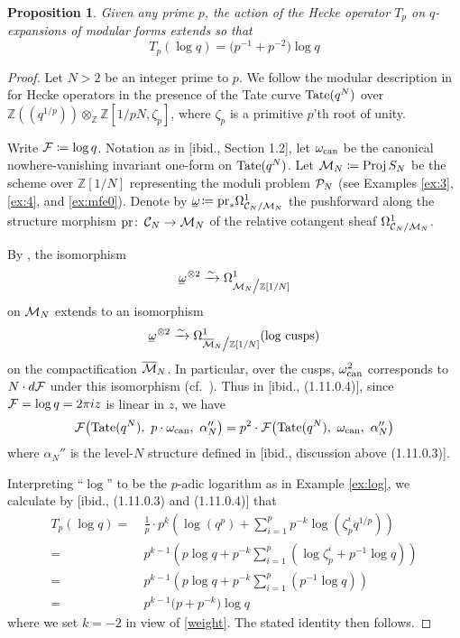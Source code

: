 \documentclass{gtpart}
\newtheorem{prop}[thm]{Proposition}
\theoremstyle{definition}
\theoremstyle{remark}
\def\co{\colon\thinspace}
\newcommand{\mb}[1]{\mathbb{#1}}
\newcommand{\Proj}{{\rm Proj\thinspace}}
\newcommand{\CC}{{\cal C}}
\newcommand{\CF}{{\cal F}}
\newcommand{\CM}{{\cal M}}
\newcommand{\CMB}{\overline {\cal M}}
\newcommand{\CP}{{\cal P}}
\newcommand{\BZ}{{\mb Z}}
\newcommand{\can}{{\rm can}}
\newcommand{\A}{\alpha}
\renewcommand{\o}{\omega}
\newcommand{\ou}{\underline{\omega\!}}
\newcommand{\ce}{\coloneqq}
\newcommand{\lp}{(\!(}
\newcommand{\rp}{)\!)}
\renewcommand{\=}{\approx}
\renewcommand{\-}{\sim}
\newcommand{\Tate}{{\rm Tate}}
\numberwithin{equation}{section}
\numberwithin{thm}{section}
\begin{document}
\begin{prop}
 \label{prop:logq}
 Given any prime $p$, the action of the Hecke operator $T_p$ on $q$-expansions of modular forms extends so that 
 \[
  T_p (\log q) = \big( p^{-1} + p^{-2} \big) \log q 
 \]
\end{prop}
\begin{proof}
 Let $N > 2$ be an integer prime to $p$.  
 We follow the modular description in \cite[Section 1.11]{padicprop} for Hecke operators in the presence of the Tate curve 
 $\Tate(q^N)$ over $\BZ \lp q^{1 / p} \rp \otimes_\BZ \BZ [1 / p N, \zeta_p]$, where $\zeta_p$ is a primitive $p$'th root of unity.  

 Write $\CF \ce \log q$.  
 Notation as in [ibid., Section 1.2], let $\o_\can$ be the canonical nowhere-vanishing invariant one-form on $\Tate(q^N)$.  
 Let $\CM_N \ce \Proj S_N$ be the scheme over $\BZ[1/N]$ representing the moduli problem $\CP_N$ (see Examples \ref{ex:3}, \ref{ex:4}, and \ref{ex:mfe0}).  
 Denote by $\ou \ce {\rm pr}_* \Omega^1_{\CC_N/\CM_N}$ the pushforward along the structure morphism ${\rm pr} \co \CC_N \to \CM_N$ of the relative cotangent sheaf $\Omega^1_{\CC_N/\CM_N}$.  

 By \cite[Theorem 10.13.11]{KM}, the isomorphism 
 \[
  \ou^{~\! \otimes 2} \xrightarrow{\sim} \Omega^1_{\CM_N \big/ \BZ[1/N]} 
 \]
 on $\CM_N$ extends to an isomorphism 
 \[
  \ou^{~\! \otimes 2} \xrightarrow{\sim} \Omega^1_{\CMB_N \big/ \BZ[1/N]} (\text{log cusps}) 
 \]
 on the compactification $\CMB_N$.  
 In particular, over the cusps, $\o_\can^2$ corresponds to $N \cdot d\CF$ under this isomorphism (cf.~\cite[Section 1.5]{padicprop}).  
 Thus in [ibid., (1.11.0.4)], since $\CF = \log q = 2 \pi i z$ is linear in $z$, we have 
 \begin{equation}
  \label{weight}
  \CF \big( \Tate(q^N), ~ p \cdot \o_\can, ~ \A_N'' \big) = p^2 \cdot \CF \big( \Tate(q^N), ~ \o_\can, ~ \A_N'' \big) 
 \end{equation}
 where $\A_N''$ is the level-$N$ structure defined in [ibid., discussion above (1.11.0.3)].  

 Interpreting ``$\log$'' to be the $p$-adic logarithm as in Example \ref{ex:log}, 
 we calculate by [ibid., (1.11.0.3) and (1.11.0.4)] that 
 \begin{equation}
  \label{Tplogq}
  \begin{split}
   T_p (\log q) = & ~ \frac{1}{p}\cdot p^k \left( \log(q^p) + \sum_{i=1}^p p^{-k} \log(\zeta_p^i q^{1/p}) \right) \\
                = & ~ p^{k - 1} \left( p \log q + p^{-k} \sum_{i=1}^p (\log \zeta_p^i + p^{-1} \log q) \right) \\
                = & ~ p^{k - 1} \left( p \log q + p^{-k} \sum_{i=1}^p (p^{-1} \log q) \right) \\
                = & ~ p^{k - 1} \big( p + p^{-k} \big) \log q 
  \end{split}
 \end{equation}
 where we set $k = -2$ in view of \eqref{weight}.  The stated identity then follows.  
\end{proof}
\end{document}
